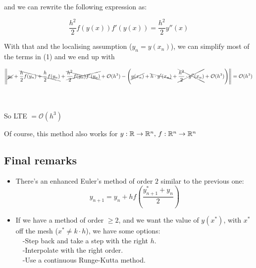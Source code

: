and we can rewrite the following expression as:

\[
  \frac{h^2}{2}f(y(x))f'(y(x)) = \frac{h^2}{2}y''(x)
\]

With that and the localising assumption ($y_n = y(x_n)$), we can simplify most of the terms in (1) and we end up with

\small

\[
  \left\lVert\cancel{y_n} + \bcancel{\frac{h}{2}f(y_n) + \frac{h}{2}f(y_n)} + \xcancel{\frac{h^2}{2}f(y_n)f'(y_n)} + \mathcal{O}(h^3)  - \left(\cancel{y(x_n)} + \bcancel{h\cdot y'(x_n)} + \xcancel{\frac{h^2}{2}\cdot y''(x_n)} + \mathcal{O}(h^3) \right)\right\rVert = \mathcal{O}(h^3)
\]

\normalsize
\-\\\\
So LTE $= \mathcal{O}(h^3)$\\

\begin{remark}
  Of course, this method also works for $y: \mathbb{R} \to \mathbb{R}^n, \, f:\mathbb{R}^n \to \mathbb{R}^n$
\end{remark}

\subsection{Final remarks}
\begin{itemize}
    \item There's an enhanced Euler's method of order $2$ similar to the previous one: $$\boxed{y_{n+1} = y_n + hf\left(\frac{y_{n+1}^* + y_n}{2}\right)}$$
    \item If we have a method of order $\geq 2$, and we want the value of $y(x^*)$, with $x^*$ off the mesh ($x^* \not= k\cdot h$), we have some options:\\
    
    $\quad$-Step back and take a step with the right $h$.\\
    
    $\quad$-Interpolate with the right order.\\
    
    $\quad$-Use a continuous Runge-Kutta method.
\end{itemize}

